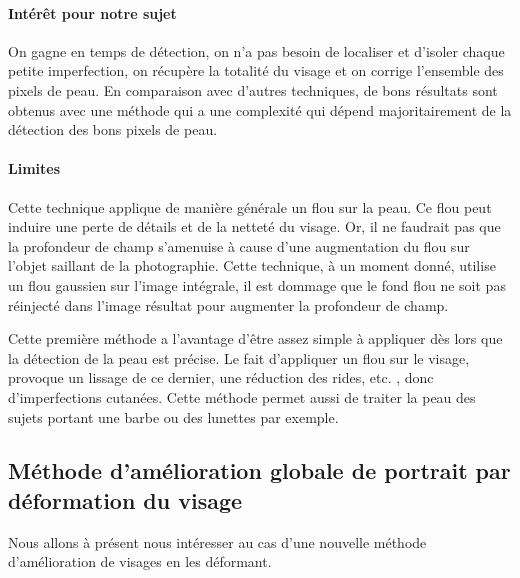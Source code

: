 \documentclass[11pt, french]{report-rd-info}
\begin{document}
\paragraph{Intérêt pour notre sujet}
On gagne en temps de détection, on n’a pas besoin de localiser et d’isoler chaque petite imperfection, on récupère la totalité du visage et on corrige l’ensemble des pixels de peau. En comparaison avec d’autres techniques, de bons résultats sont obtenus avec une méthode qui a une complexité qui dépend majoritairement de la détection des bons pixels de peau.
\paragraph{Limites}
Cette technique applique de manière générale un flou sur la peau. Ce flou peut induire une perte de détails et de la netteté du visage. Or, il ne faudrait pas que la profondeur de champ s’amenuise à cause d’une augmentation du flou sur l'objet saillant de la photographie. Cette technique, à un moment donné, utilise un flou gaussien sur l’image intégrale, il est dommage que le fond flou ne soit pas réinjecté dans l’image résultat pour augmenter la profondeur de champ.

Cette première méthode a l’avantage d’être assez simple à appliquer dès lors que la détection de la peau est précise. Le fait d’appliquer un flou sur le visage, provoque un lissage de ce dernier, une réduction des rides, etc. , donc d’imperfections cutanées. Cette méthode permet aussi de traiter la peau des sujets portant une barbe ou des lunettes par exemple.
\subsection{Méthode d’amélioration globale de portrait par déformation du visage}
Nous allons à présent nous intéresser au cas d’une nouvelle méthode d’amélioration de visages en les déformant.
\end{document}
